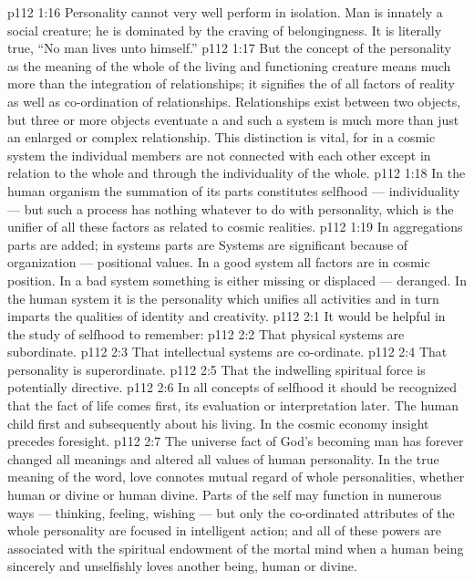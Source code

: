 \vs p112 1:16 Personality cannot very well perform in isolation. Man is innately a social creature; he is dominated by the craving of belongingness. It is literally true, “No man lives unto himself.”
\vs p112 1:17 But the concept of the personality as the meaning of the whole of the living and functioning creature means much more than the integration of relationships; it signifies the  of all factors of reality as well as co\hyp{}ordination of relationships. Relationships exist between two objects, but three or more objects eventuate a  and such a system is much more than just an enlarged or complex relationship. This distinction is vital, for in a cosmic system the individual members are not connected with each other except in relation to the whole and through the individuality of the whole.
\vs p112 1:18 In the human organism the summation of its parts constitutes selfhood --- individuality --- but such a process has nothing whatever to do with personality, which is the unifier of all these factors as related to cosmic realities.
\vs p112 1:19 In aggregations parts are added; in systems parts are  Systems are significant because of organization --- positional values. In a good system all factors are in cosmic position. In a bad system something is either missing or displaced --- deranged. In the human system it is the personality which unifies all activities and in turn imparts the qualities of identity and creativity.
\vs p112 2:1 It would be helpful in the study of selfhood to remember:
\vs p112 2:2 \bibnobreakspace That physical systems are subordinate.
\vs p112 2:3 \bibnobreakspace That intellectual systems are co\hyp{}ordinate.
\vs p112 2:4 \bibnobreakspace That personality is superordinate.
\vs p112 2:5 \bibnobreakspace That the indwelling spiritual force is potentially directive.
\vs p112 2:6 \pc In all concepts of selfhood it should be recognized that the fact of life comes first, its evaluation or interpretation later. The human child first  and subsequently  about his living. In the cosmic economy insight precedes foresight.
\vs p112 2:7 \pc The universe fact of God’s becoming man has forever changed all meanings and altered all values of human personality. In the true meaning of the word, love connotes mutual regard of whole personalities, whether human or divine or human  divine. Parts of the self may function in numerous ways --- thinking, feeling, wishing --- but only the co\hyp{}ordinated attributes of the whole personality are focused in intelligent action; and all of these powers are associated with the spiritual endowment of the mortal mind when a human being sincerely and unselfishly loves another being, human or divine.
